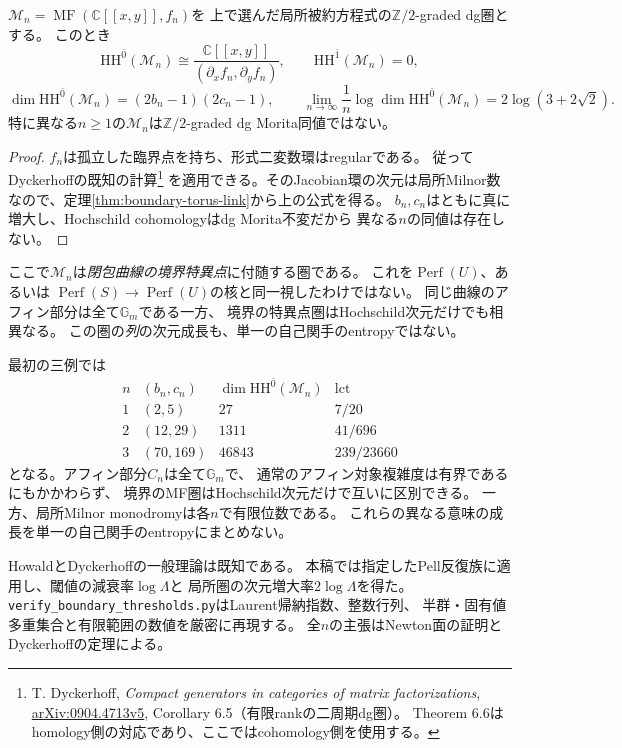 \begin{corollary}
\label{cor:boundary-mf-growth}
$\mathcal M_n=\operatorname{MF}(\mathbb C[[x,y]],f_n)$を
上で選んだ局所被約方程式の$\mathbb Z/2$-graded dg圏とする。
このとき
\[
 \mathrm{HH}^{\bar0}(\mathcal M_n)
 \cong\frac{\mathbb C[[x,y]]}{(\partial_x f_n,\partial_y f_n)},
 \qquad\mathrm{HH}^{\bar1}(\mathcal M_n)=0,
\]
\[
 \dim\mathrm{HH}^{\bar0}(\mathcal M_n)
 =(2b_n-1)(2c_n-1),\qquad
 \lim_{n\to\infty}\frac1n\log\dim\mathrm{HH}^{\bar0}(\mathcal M_n)
 =2\log(3+2\sqrt2).
\]
特に異なる$n\ge1$の$\mathcal M_n$は$\mathbb Z/2$-graded dg Morita同値ではない。
\end{corollary}
\begin{proof}
$f_n$は孤立した臨界点を持ち、形式二変数環はregularである。
従ってDyckerhoffの既知の計算\footnote{
T. Dyckerhoff, \emph{Compact generators in categories of matrix factorizations},
\href{https://arxiv.org/abs/0904.4713v5}{arXiv:0904.4713v5},
Corollary 6.5（有限rankの二周期dg圏）。
Theorem 6.6はhomology側の対応であり、ここではcohomology側を使用する。}
を適用できる。そのJacobian環の次元は局所Milnor数なので、定理\ref{thm:boundary-torus-link}から上の公式を得る。
$b_n,c_n$はともに真に増大し、Hochschild cohomologyはdg Morita不変だから
異なる$n$の同値は存在しない。
\end{proof}

ここで$\mathcal M_n$は\emph{閉包曲線の境界特異点}に付随する圏である。
これを$\operatorname{Perf}(U)$、あるいは
$\operatorname{Perf}(S)\to\operatorname{Perf}(U)$の核と同一視したわけではない。
同じ曲線のアフィン部分は全て$\mathbb G_m$である一方、
境界の特異点圏はHochschild次元だけでも相異なる。
この圏の\emph{列}の次元成長も、単一の自己関手のentropyではない。

\begin{remark}[同じアフィン曲線と異なる境界の圏]
最初の三例では
\[
\begin{array}{c|c|c|c}
 n&(b_n,c_n)&\dim\mathrm{HH}^{\bar0}(\mathcal M_n)&\operatorname{lct}\\ \hline
 1&(2,5)&27&7/20\\
 2&(12,29)&1311&41/696\\
 3&(70,169)&46843&239/23660
\end{array}
\]
となる。アフィン部分$C_n$は全て$\mathbb G_m$で、
通常のアフィン対象複雑度は有界であるにもかかわらず、
境界のMF圏はHochschild次元だけで互いに区別できる。
一方、局所Milnor monodromyは各$n$で有限位数である。
これらの異なる意味の成長を単一の自己関手のentropyにまとめない。

HowaldとDyckerhoffの一般理論は既知である。
本稿では指定したPell反復族に適用し、閾値の減衰率$\log\Lambda$と
局所圏の次元増大率$2\log\Lambda$を得た。
\texttt{verify\_boundary\_thresholds.py}はLaurent帰納指数、整数行列、
半群・固有値多重集合と有限範囲の数値を厳密に再現する。
全$n$の主張はNewton面の証明とDyckerhoffの定理による。
\end{remark}
